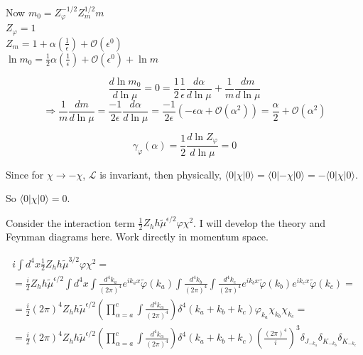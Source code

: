 \documentclass[twoside]{amsart}
\newcommand{\solutionhead}[1]
  {\smallskip
   \noindent{\large\bf Solution #1.}
   }
\begin{document}
\noindent Now $m_0 = Z_{\varphi}^{-1/2} Z_m^{1/2} m$  \\
\phantom{Now} $Z_{\varphi} =1$ \\ 
\phantom{Now} $Z_m = 1 + \alpha \left( \frac{1}{ \epsilon } \right) + \mathcal{O}(\epsilon^0)$ \\
$\ln{ m_0} = \frac{1}{2} \alpha \left( \frac{1}{ \epsilon } \right) + \mathcal{O}(\epsilon^0) + \ln{m}$ 

\[
\frac{d\ln{m_0} }{ d \ln{\mu}} = 0 = \frac{1}{2} \frac{ 1 }{ \epsilon } \frac{ d\alpha}{ d\ln{ \mu}} + \frac{1}{m } \frac{dm}{ d\ln{ \mu }}   
\]
\[
  \Longrightarrow \frac{1}{m} \frac{dm}{ d\ln{ \mu}} = \frac{-1}{2\epsilon } \frac{d\alpha}{ d\ln{ \mu}} = \frac{-1}{2 \epsilon } ( - \epsilon \alpha + \mathcal{O}(\alpha^2) ) = \frac{\alpha}{2} + \mathcal{O}(\alpha^2)
    \]



\[
\boxed{ \gamma_{ \varphi}(\alpha) = \frac{1}{2} \frac{ d\ln{ Z_{\varphi}} }{ d\ln{ \mu}} = 0 }
\]






\solutionhead{28.3}

Since for $\chi \to - \chi$, $\mathcal{L}$ is invariant, then physically, $\langle 0 | \chi | 0 \rangle =\langle 0 | - \chi | 0 \rangle = - \langle 0 | \chi | 0 \rangle$.  

So $\langle 0 | \chi | 0 \rangle = 0$.  

Consider the interaction term $\frac{1}{2} Z_h h \widetilde{\mu}^{\epsilon/2} \varphi \chi^2$.  I will develop the theory and Feynman diagrams here.  Work directly in momentum space.  

\[
\begin{gathered}
  i \int d^4x \frac{1}{2} Z_h h \widetilde{\mu}^{3/2} \varphi \chi^2 = \\
  = \frac{i}{2} Z_h h \widetilde{ \mu}^{\epsilon/2} \int d^4x \int \frac{d^4k_a}{(2\pi)^4} e^{ik_a x} \widetilde{\varphi}(k_a) \int \frac{d^4k_b}{(2\pi)^4} \int \frac{ d^4k_c}{(2\pi)^4} e^{ik_b x} \widetilde{\varphi}(k_b) e^{ik_c x} \widetilde{\varphi}(k_c)   = \\
  = \frac{i}{2} (2\pi)^4 Z_h h \widetilde{\mu}^{\epsilon/2} \left( \prod_{\alpha = a}^c \int \frac{d^4k_{\alpha}}{ (2\pi)^4} \right) \delta^4(k_a+k_b+k_c) \varphi_{k_a} \chi_{k_b} \chi_{k_c} = \\
  = \frac{i}{2} (2\pi)^4 Z_h h\widetilde{\mu}^{\epsilon/2} \left( \prod_{\alpha =a}^c \int \frac{d^4k_{\alpha}}{ (2\pi)^4} \right) \delta^4(k_a+k_b+k_c) \left( \frac{ (2\pi)^4}{ i } \right)^3 \delta_{J_{-k_a}} \delta_{K_{-k_b}} \delta_{K_{-k_c}}
\end{gathered}
\]
\end{document}
